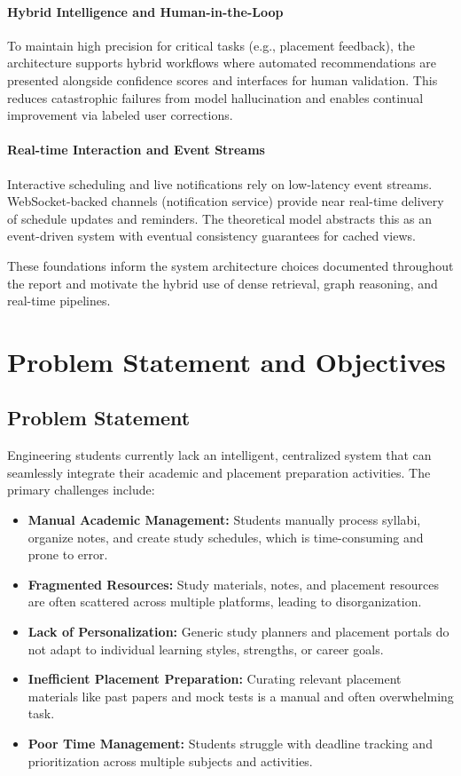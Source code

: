 \documentclass[12pt]{article}
\begin{document}
\paragraph{Hybrid Intelligence and Human-in-the-Loop}
To maintain high precision for critical tasks (e.g., placement feedback), the architecture supports hybrid workflows where automated recommendations are presented alongside confidence scores and interfaces for human validation. This reduces catastrophic failures from model hallucination and enables continual improvement via labeled user corrections.

\paragraph{Real-time Interaction and Event Streams}
Interactive scheduling and live notifications rely on low-latency event streams. WebSocket-backed channels (notification service) provide near real-time delivery of schedule updates and reminders. The theoretical model abstracts this as an event-driven system with eventual consistency guarantees for cached views.

These foundations inform the system architecture choices documented throughout the report and motivate the hybrid use of dense retrieval, graph reasoning, and real-time pipelines.

\section{Problem Statement and Objectives}
\subsection{Problem Statement}
Engineering students currently lack an intelligent, centralized system that can seamlessly integrate their academic and placement preparation activities. The primary challenges include:
\begin{itemize}
    \item \textbf{Manual Academic Management:} Students manually process syllabi, organize notes, and create study schedules, which is time-consuming and prone to error.
    \item \textbf{Fragmented Resources:} Study materials, notes, and placement resources are often scattered across multiple platforms, leading to disorganization.
    \item \textbf{Lack of Personalization:} Generic study planners and placement portals do not adapt to individual learning styles, strengths, or career goals.
    \item \textbf{Inefficient Placement Preparation:} Curating relevant placement materials like past papers and mock tests is a manual and often overwhelming task.
    \item \textbf{Poor Time Management:} Students struggle with deadline tracking and prioritization across multiple subjects and activities.
\end{itemize}
\end{document}
